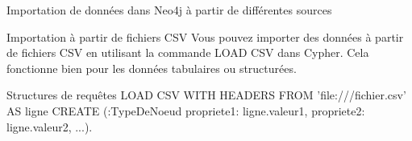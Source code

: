 \begin{frame}{Importation de données dans Neo4j à partir de différentes sources}
  \begin{block}{Importation à partir de fichiers CSV}
  Vous pouvez importer des données à partir de fichiers CSV en utilisant la commande LOAD CSV dans Cypher. Cela fonctionne bien pour les données tabulaires ou structurées.

  \end{block}
  \begin{block}{Structures de requêtes}
  LOAD CSV WITH HEADERS FROM 'file:///fichier.csv' AS ligne
CREATE (:TypeDeNoeud {propriete1: ligne.valeur1, propriete2: ligne.valeur2, ...}).
  \end{block}
\end{frame}